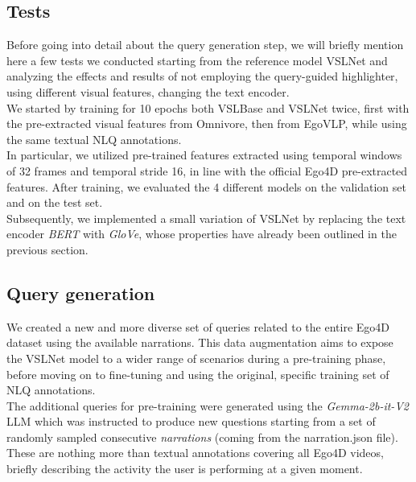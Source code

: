\documentclass[10pt,twocolumn,letterpaper]{article}
\begin{document}
 \subsection{Tests}
Before going into detail about the query generation step, we will briefly mention here a few tests we conducted starting from the reference model VSLNet and analyzing the effects and results of not employing the query-guided highlighter, using different visual features, changing the text encoder. \\
We started by training for 10 epochs both VSLBase and VSLNet twice, first with the pre-extracted visual features from Omnivore, then from EgoVLP, while using the same textual NLQ annotations.\\
In particular, we utilized pre-trained features extracted using temporal windows of 32 frames and temporal stride 16, in line with the official Ego4D pre-extracted features.
After training, we evaluated the 4 different models on the validation set and on the test set.\\
Subsequently, we implemented a small variation of VSLNet by replacing the text encoder \textit{BERT} with \textit{GloVe}, whose properties have already been outlined in the previous section.\\


\subsection{Query generation}
We created a new and more diverse set of queries related to the entire Ego4D dataset using the available narrations. This data augmentation aims to expose the VSLNet model to a wider range of scenarios during a pre-training phase, before moving on to fine-tuning and using the original, specific training set of NLQ annotations.\\ 
The additional queries for pre-training were generated using the \textit{Gemma-2b-it-V2} LLM which was instructed to produce new questions starting from a set of randomly sampled consecutive \textit{narrations} (coming from the narration.json file). These are nothing more than textual annotations covering all Ego4D videos, briefly describing the activity the user is performing at a given moment.
\end{document}

